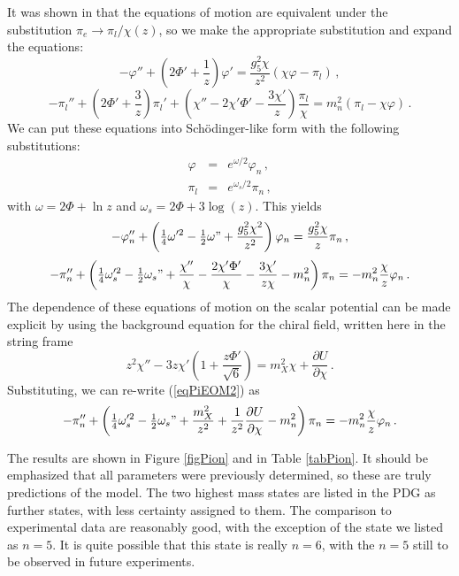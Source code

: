 \documentclass[aps,prd,12pt,nofootinbib]{revtex4}
\newcommand{\be}{\begin{equation}}
\newcommand{\ee}{\end{equation}}
\newcommand{\ba}{\begin{eqnarray}}
\newcommand{\ea}{\end{eqnarray}}
\def\thalf{{\textstyle{\frac{1}{2}}}}
\def\oneqt{{\textstyle{\frac{1}{4}}}}
\def\rt6{\sqrt{6}}
\begin{document}
It was shown in \cite{bartz-pions} that the equations of motion are equivalent under the substitution $\pi_e \rightarrow \pi_l/\chi(z)$, so we make the appropriate substitution and expand the equations:
\be
- \varphi'' + \left(2\Phi'+\frac{1}{z}\right)\varphi' = \frac{g_5^2 \chi}{z^2}(\chi \varphi -\pi_l) \, ,
\ee
\be 
-\pi_l'' + \left(2\Phi'+\frac{3}{z}\right)\pi_l' + \left(\chi''-2\chi' \Phi' - \frac{3 \chi'}{z}\right)\frac{\pi_l}{\chi} = m_n^2 (\pi_l - \chi \varphi) \, .
\ee
We can put these equations into Sch{\"o}dinger-like form with the following substitutions:
\ba
\varphi & = & e^{\omega/2}\varphi_n \, , \\
\pi_l & = & e^{\omega_s/2} \pi_n \, , 
\ea
with $\omega =2 \Phi + \ln z$ and $\omega_s = 2 \Phi + 3\log(z)$.
This yields 
\be
-\varphi_n''+\left(\oneqt \omega'^2-\thalf \omega" +\frac{g_5^2 \chi^2}{z^2}\right)\varphi_n = \frac{g_5^2 \chi}{z} \pi_n \, ,
\ee
\be
-\pi_n''+\left(\oneqt \omega_s'^2-\thalf \omega_s" +\frac{\chi''}{\chi}-\frac{2\chi' \Phi'}{\chi} - \frac{3 \chi'}{z\chi}-m_n^2 \right) \pi_n = -m_n^2 \frac{\chi}{z}\varphi_n \, .
\label{eqPiEOM2}
\ee
The dependence of these equations of motion on the scalar potential can be made explicit by using the background equation for the chiral field, written here in the string frame
\be
z^2\chi'' -3z\chi' \left(1+\frac{z\Phi'}{\rt6} \right) = m_X^2\chi +\frac{\partial U}{\partial \chi} \, .
\ee
Substituting, we can re-write (\ref{eqPiEOM2}) as
\be
-\pi_n''+\left(\oneqt \omega_s'^2-\thalf \omega_s" +\frac{m_X^2}{z^2}+\frac{1}{z^2} \frac{\partial U}{\partial \chi} -m_n^2 \right) \pi_n = -m_n^2 \frac{\chi}{z}\varphi_n \, .
\ee

The results are shown in Figure \ref{figPion} and in Table \ref{tabPion}.  It should be emphasized that all parameters were previously determined, so these are truly predictions of the model.  The two highest mass states are listed in the PDG as further states, with less certainty assigned to them.  The comparison to experimental data are reasonably good, with the exception of the state we listed as $n=5$.  It is quite possible that this state is really $n=6$, with the $n=5$ still to be observed in future experiments.

\clearpage 
\end{document}
